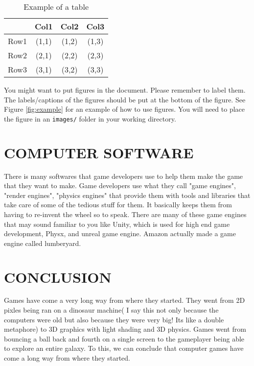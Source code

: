 \documentclass[letterpaper, 10 pt, conference]{IEEEconf}
\begin{document}
\begin{table}[h!]
\begin{center}
\begin{tabular}{||c | c | c | c||} 
\hline
  & Col1 & Col2 & Col3 \\ [0.5ex]
\hline\hline
Row1 & (1,1) & (1,2) & (1,3) \\ 
\hline
Row2 & (2,1) & (2,2) & (2,3) \\
\hline
Row3 & (3,1) & (3,2) & (3,3) \\
\hline
\end{tabular}
\caption{Example of a table}
\label{tbl:example}
\end{center}
\end{table}

You might want to put figures in the document. Please
remember to label them. The labels/captions of the figures
should be put at the bottom of the figure. See Figure
\ref{fig:example} for an example of how to use figures.
You will need to place the figure in an \texttt{images/} folder
in your working directory.


\section{COMPUTER SOFTWARE}
	There is many softwares that game developers use to help them make the game that they want to make. Game developers use what they call "game engines", "render engines", "physics engines" that provide them with tools and libraries that take care of some of the tedious stuff for them. It basically keeps them from having to re-invent the wheel so to speak. There are many of these game engines that may sound familiar to you like Unity, which is used for high end game development, Physx, and unreal game engine. Amazon actually made a game engine called lumberyard.

\section{CONCLUSION}
	Games have come a very long way from where they started. They went from 2D pixles being ran on a dinosaur machine( I say this not only because the computers were old but also because they were very big! Its like a double metaphore) to 3D graphics with light shading and 3D physics. Games went from bouncing a ball back and fourth on a single screen to the gameplayer being able to explore an entire galaxy. To this, we can conclude that computer games have come a long way from where they started. 
\end{document}

